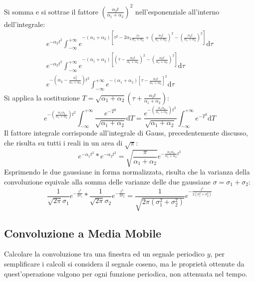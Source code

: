 \documentclass{article}
\newcommand{\df}{\mathrm{d}}
\numberwithin{equation}{subsection}
\begin{document}
Si somma e si sottrae il fattore $\displaystyle\left(\frac{\alpha_2t}{\alpha_1+\alpha_2}\right)^2$ nell'esponenziale all'interno dell'integrale:
\begin{gather*}
    \displaystyle e^{-\alpha_2 t^2}\int_{-\infty}^{+\infty}e^{-(\alpha_1+\alpha_2)\left[\tau^2-2\alpha_2\frac{t\tau}{\alpha_1+\alpha_2}+\left(\frac{\alpha_2t}{\alpha_1+\alpha_2}\right)^2-\left(\frac{\alpha_2t}{\alpha_1+\alpha_2}\right)^2\right]}\df\tau\\
    \displaystyle e^{-\alpha_2 t^2}\int_{-\infty}^{+\infty}e^{-(\alpha_1+\alpha_2)\left[\left(\tau-\frac{\alpha_2t}{\alpha_1+\alpha_2}\right)^2-\left(\frac{\alpha_2t}{\alpha_1+\alpha_2}\right)^2\right]}\df\tau\\
    \displaystyle e^{-\left(\alpha_2-\frac{\alpha_2^2}{\alpha_1+\alpha_2}\right)t^2}\int_{-\infty}^{+\infty}e^{-(\alpha_1+\alpha_2)\left[\tau-\frac{\alpha_2t}{\alpha_1+\alpha_2}\right]^2}\df\tau
\end{gather*}
Si applica la sostituzione $T=\displaystyle\sqrt{\alpha_1+\alpha_2}\left(\tau+\frac{\alpha_2t}{\alpha_1+\alpha_2}\right)$:
\begin{equation*}
    \displaystyle e^{-\left(\frac{\alpha_1\alpha_2}{\alpha_1+\alpha_2}\right)t^2}\int_{-\infty}^{+\infty}\frac{e^{-T^2}}{\sqrt{\alpha_1+\alpha_2}}\df T=\frac{e^{-\left(\frac{\alpha_1\alpha_2}{\alpha_1+\alpha_2}\right)t^2}}{\sqrt{\alpha_1+\alpha_2}}\int_{-\infty}^{+\infty}{e^{-T^2}}\df T
\end{equation*}
Il fattore integrale corrisponde all'integrale di Gauss, precedentemente discusso, che risulta su tutti i reali in un area di $\sqrt\pi$:
\begin{equation*}
    e^{-\alpha_1t^2}*e^{-\alpha_2t^2}=\displaystyle\sqrt{\frac{\pi}{\alpha_1+\alpha_2}}e^{-\frac{\alpha_1\alpha_2}{\alpha_1+\alpha_2}t^2}
\end{equation*}
Esprimendo le due gaussiane in forma normalizzata, risulta che la varianza della convoluzione equivale alla somma delle varianze delle due gaussiane $\sigma=\sigma_1+\sigma_2$:
\begin{equation}
    \displaystyle\frac{1}{\sqrt{2\pi}\sigma_1}e^{-\frac{t^2}{2\sigma_1}}*\frac{1}{\sqrt{2\pi}\sigma_2}e^{-\frac{t^2}{2\sigma_2}}=\frac{1}{\sqrt{2\pi(\sigma_1^2+\sigma_2^2)}}e^{-\frac{t^2}{2(\sigma_1^2+\sigma_2^2)}}
\end{equation}

\subsection{Convoluzione a Media Mobile}
Calcolare la convoluzione tra una finestra ed un segnale periodico $y$, 
per semplificare i calcoli si considera il segnale coseno, ma le proprietà ottenute da quest'operazione valgono per ogni funzione periodica, non attenuata nel tempo. 
\end{document}

